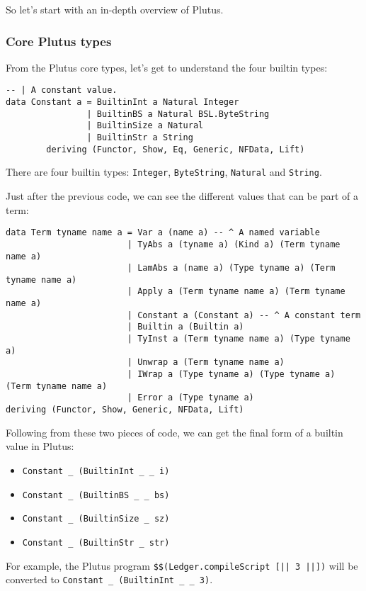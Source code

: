 \documentclass{article}
\begin{document}
So let's start with an in-depth overview of Plutus.

\subsubsection{Core Plutus types}
From the Plutus core types\cite{plutus-core-constant}, let's get to understand the four builtin types:
\nopagebreak
\begin{verbatim}
-- | A constant value.
data Constant a = BuiltinInt a Natural Integer
                | BuiltinBS a Natural BSL.ByteString
                | BuiltinSize a Natural
                | BuiltinStr a String
        deriving (Functor, Show, Eq, Generic, NFData, Lift)
\end{verbatim}

There are four builtin types: \verb|Integer|, \verb|ByteString|, \verb|Natural| and \verb|String|.

Just after the previous code\cite{plutus-core-term}, we can see the different values that can be part of a term:
\nopagebreak
\begin{verbatim}
data Term tyname name a = Var a (name a) -- ^ A named variable
                        | TyAbs a (tyname a) (Kind a) (Term tyname name a)
                        | LamAbs a (name a) (Type tyname a) (Term tyname name a)
                        | Apply a (Term tyname name a) (Term tyname name a)
                        | Constant a (Constant a) -- ^ A constant term
                        | Builtin a (Builtin a)
                        | TyInst a (Term tyname name a) (Type tyname a)
                        | Unwrap a (Term tyname name a)
                        | IWrap a (Type tyname a) (Type tyname a) (Term tyname name a)
                        | Error a (Type tyname a)
deriving (Functor, Show, Generic, NFData, Lift)
\end{verbatim}

Following from these two pieces of code, we can get the final form of a builtin value in Plutus:
\nopagebreak
\begin{itemize}
\item \verb|Constant _ (BuiltinInt _ _ i)|
\item \verb|Constant _ (BuiltinBS _ _ bs)|
\item \verb|Constant _ (BuiltinSize _ sz)|
\item \verb|Constant _ (BuiltinStr _ str)|
\end{itemize}

For example, the Plutus program \verb#$$(Ledger.compileScript [|| 3 ||])#
will be converted to \verb#Constant _ (BuiltinInt _ _ 3)#.
\end{document}
